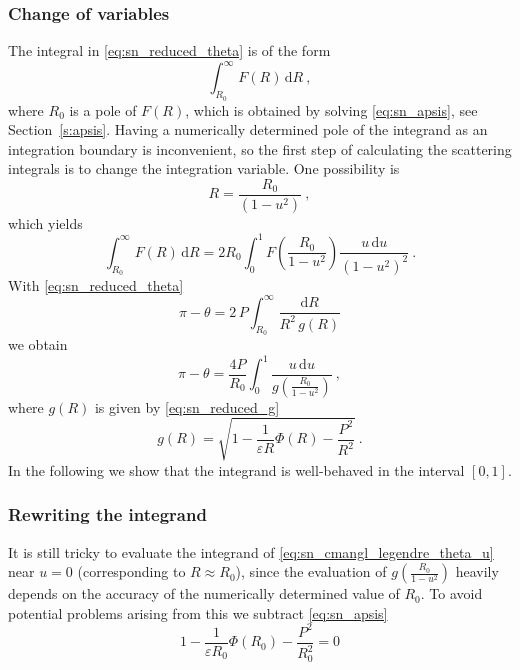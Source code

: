 
\subsubsection{Change of variables}
%
The integral in \cref{eq:sn_reduced_theta} is of the form
%
\begin{equation}
    \label{eq:sn_integration_integral_R}
    \int_{R_0}^\infty F(R) \, \mathrm{d}R ~,
\end{equation}
%
where \(R_0\) is a pole of $F(R)$, which is obtained by solving \cref{eq:sn_apsis}, see Section~\ref{s:apsis}.
Having a numerically determined pole of the integrand as an integration boundary is inconvenient, so the first step of calculating the scattering integrals is to change the integration variable.
One possibility is \cite{Eck91}
%
\begin{equation}
    \label{eq:sn_transform1}
    R = \frac{ R_0 }{ (1-u^2) } ~,
\end{equation}
%
which yields
%
\begin{equation}
    \label{eq:sn_integration_integral_u1}
    \int_{R_0}^\infty F(R) \, \mathrm{d}R =
        2 R_0 \int_0^1 F \left( \frac{ R_0 }{ 1-u^2 } \right)
        \frac{ u \, \mathrm{d}u }{ (1-u^2)^2 } ~.
\end{equation}
%
With \cref{eq:sn_reduced_theta}
%
\begin{equation*}
    \pi - \theta = 2 \, P \int_{R_0}^\infty
        \frac{ \mathrm{d}R }{ R^2 \, g(R) }
\end{equation*}
%
we obtain
%
\begin{equation}
    \label{eq:sn_cmangl_legendre_theta_u}
    \pi - \theta = \frac{ 4 P }{ R_0 } \int_0^1
        \frac{ u \, \mathrm{d}u }{ g \left( \frac{ R_0 }{ 1-u^2 } \right) } ~,
\end{equation}
%
where $g(R)$ is given by \cref{eq:sn_reduced_g}
%
\begin{equation*}
    g(R) = \sqrt{ 1 - \frac{ 1 }{ \varepsilon R } \Phi(R)
        - \frac{ P^2 }{ R^2 } } ~.
\end{equation*}
%
In the following we show that the integrand is well-behaved in the interval $[0, 1]$.

\subsubsection{Rewriting the integrand}
%
It is still tricky to evaluate the integrand of \cref{eq:sn_cmangl_legendre_theta_u} near $u = 0$ (corresponding to $R \approx R_0$), since the evaluation of $g \left ( \frac{ R_0 }{ 1-u^2 } \right)$ heavily depends on the accuracy of the numerically determined value of $R_0$.
To avoid potential problems arising from this we subtract \cref{eq:sn_apsis}
%
\begin{equation*}
    1 - \frac{1}{\varepsilon R_0} \Phi(R_0) - \frac{P^2}{R_0^2} = 0
\end{equation*}

